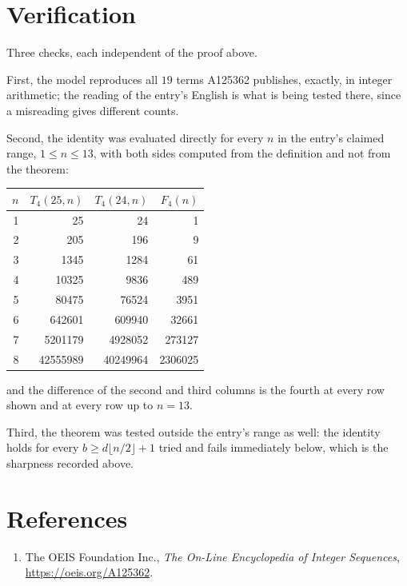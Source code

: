 \documentclass[11pt,a4paper]{article}
\theoremstyle{plain}
\theoremstyle{definition}
\begin{document}
\section{Verification}

Three checks, each independent of the proof above.

First, the model reproduces all $19$ terms A125362 publishes, exactly, in integer
arithmetic; the reading of the entry's English is what is being tested there, since a
misreading gives different counts.

Second, the identity was evaluated directly for every $n$ in the entry's claimed range,
$1\le n\le13$, with both sides computed from the definition and not from the theorem:

\begin{center}
\begin{tabular}{rrrr}
$n$ & $T_{4}(25,n)$ & $T_{4}(24,n)$ & $F_{4}(n)$ \\ \hline
1 & 25 & 24 & 1 \\
2 & 205 & 196 & 9 \\
3 & 1345 & 1284 & 61 \\
4 & 10325 & 9836 & 489 \\
5 & 80475 & 76524 & 3951 \\
6 & 642601 & 609940 & 32661 \\
7 & 5201179 & 4928052 & 273127 \\
8 & 42555989 & 40249964 & 2306025 \\
\end{tabular}
\end{center}

\noindent and the difference of the second and third columns is the fourth at every row shown
and at every row up to $n=13$.

Third, the theorem was tested outside the entry's range as well: the identity holds for every
$b\ge d\lfloor n/2\rfloor+1$ tried and fails immediately below, which is the sharpness recorded
above.

\section*{References}
\begin{enumerate}
\item The OEIS Foundation Inc., \emph{The On-Line Encyclopedia of Integer Sequences},
\url{https://oeis.org/A125362}.
\end{enumerate}
\end{document}
